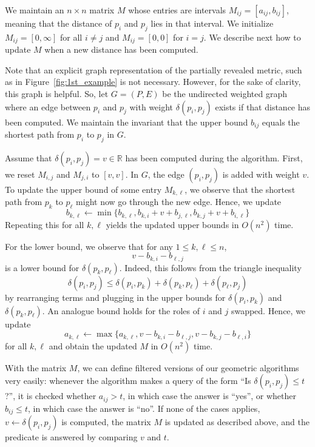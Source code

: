 \documentclass[10pt]{article}
\newcommand{\R}{\mathbb{R}}
\newcommand{\metric}{\delta}
\begin{document}
We maintain an $n\times n$ matrix $M$ whose entries
are intervals $M_{ij}=[a_{ij},b_{ij}]$, meaning that the distance
of $p_i$ and $p_j$ lies in that interval. 
We initialize $M_{ij}=[0,\infty]$ for all $i\neq j$
and $M_{ij}=[0,0]$ for $i=j$.
We describe next how to update $M$ when a new distance has been computed.

Note that an explicit graph representation of the partially revealed metric,
such as in Figure~\ref{fig:1st_example} is not necessary. However, for 
the sake of clarity,
this graph is helpful. So, let $G=(P,E)$ be the undirected weighted graph
where an edge between $p_i$ and $p_j$ with weight $\metric(p_i,p_j)$
exists if that distance has been computed. 
We maintain the invariant that the upper bound $b_{ij}$ equals the 
shortest path from $p_i$ to $p_j$ in $G$.

Assume that $\metric(p_i,p_j)=v\in\R$ has been computed during the algorithm.
First, we reset $M_{i,j}$ and $M_{j,i}$ to $[v,v]$. 
In $G$, the edge $(p_i,p_j)$ is added with weight $v$.
To update the upper bound of some entry $M_{k,\ell}$,
we observe that the shortest path from $p_k$ to $p_\ell$ might now
go through the new edge. Hence, we update
%
\[b_{k,\ell}\gets \min\{b_{k,\ell},b_{k,i}+v+b_{j,\ell},b_{k,j}+v+b_{i,\ell}\}\]
%
Repeating this for all $k,\ell$ yields the updated upper bounds in $O(n^2)$
time.

For the lower bound, we observe that for any $1\leq k,\ell\leq n$,
%
\[v-b_{k,i}-b_{\ell,j}\]
%
is a lower bound for $\metric(p_k,p_\ell)$. Indeed, this follows from
the triangle inequality
%
\[\metric(p_i,p_j)\leq \metric(p_i,p_k)+\metric(p_k,p_\ell)+\metric(p_\ell,p_j)\]
by rearranging terms and plugging in the upper bounds for $\metric(p_i,p_k)$
and $\metric(p_k,p_\ell)$. An analogue bound holds for the roles of $i$
and $j$ swapped. Hence, we update
%
\[a_{k,\ell}\gets \max\{a_{k,\ell},v-b_{k,i}-b_{\ell,j},v-b_{k,j}-b_{\ell,i}\}\]
%
for all $k,\ell$ and obtain the updated $M$ in $O(n^2)$ time.

\medskip

With the matrix $M$, we can define filtered versions of our geometric
algorithms very easily: whenever the algorithm makes a query of the form
``Is $\metric(p_i,p_j)\leq t$?'', it is checked whether $a_{ij}> t$,
in which case the answer is ``yes'', or whether $b_{ij}\leq t$,
in which case the answer is ``no''. If none of the cases applies, 
$v\gets\metric(p_i,p_j)$ is computed, 
the matrix $M$ is updated as described above, and the predicate is answered
by comparing $v$ and $t$.
\end{document}
